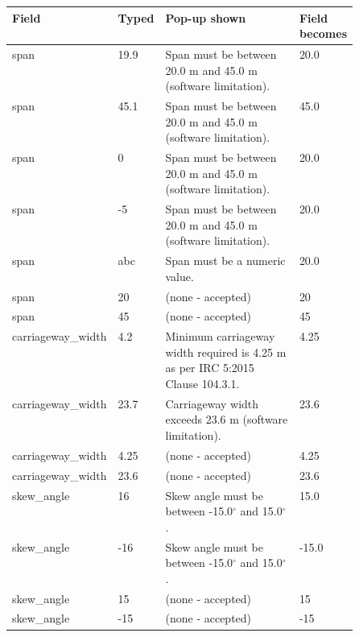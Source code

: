 \begin{tabular}{@{}ll>{\raggedright\arraybackslash}p{0.5\linewidth}l@{}}
\toprule
Field & Typed & Pop-up shown & Field becomes\\
\midrule
span & 19.9 & Span must be between 20.0 m and 45.0 m (software limitation). & 20.0\\
span & 45.1 & Span must be between 20.0 m and 45.0 m (software limitation). & 45.0\\
span & 0 & Span must be between 20.0 m and 45.0 m (software limitation). & 20.0\\
span & -5 & Span must be between 20.0 m and 45.0 m (software limitation). & 20.0\\
span & abc & Span must be a numeric value. & 20.0\\
span & 20 & (none - accepted) & 20\\
span & 45 & (none - accepted) & 45\\
carriageway\_width & 4.2 & Minimum carriageway width required is 4.25 m as per IRC 5:2015 Clause 104.3.1. & 4.25\\
carriageway\_width & 23.7 & Carriageway width exceeds 23.6 m (software limitation). & 23.6\\
carriageway\_width & 4.25 & (none - accepted) & 4.25\\
carriageway\_width & 23.6 & (none - accepted) & 23.6\\
skew\_angle & 16 & Skew angle must be between -15.0$^\circ$ and 15.0$^\circ$. & 15.0\\
skew\_angle & -16 & Skew angle must be between -15.0$^\circ$ and 15.0$^\circ$. & -15.0\\
skew\_angle & 15 & (none - accepted) & 15\\
skew\_angle & -15 & (none - accepted) & -15\\
\bottomrule
\end{tabular}
